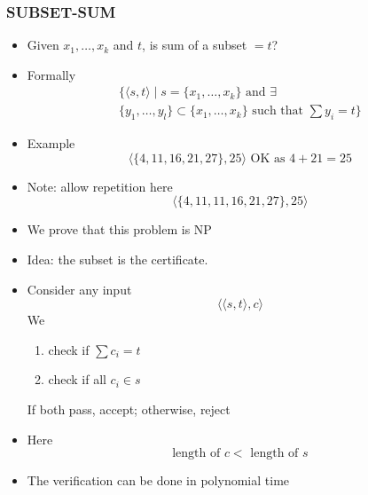 \begin{frame}[allowframebreaks] \frametitle{SUBSET-SUM}
  \begin{itemize}
\item Given $x_1, \ldots, x_k$ and $t$, is sum of a subset $=t$?
\item Formally
  \begin{gather*}
   \{\langle  s,t\rangle 
\mid s=\{x_1, \ldots, x_k\}
\mbox{ and }
\exists \\
\{y_1, \ldots, y_l\}
\subset \{x_1, \ldots, x_k\} \text{ such that }
\sum y_i =t\}
\end{gather*}
\item Example
  \begin{equation*}
\langle  \{4,11,16,21,27\},25\rangle  \text{ OK as } 4+21=25
\end{equation*}
\item Note: allow repetition here
  \begin{equation*}
\langle  \{4,11,11,16,21,27\},25\rangle 
\end{equation*}
\item We prove that this problem is NP
\item Idea: the subset is the certificate.
\item Consider any input
  \begin{equation*}
  \langle  \langle  s,t\rangle ,c\rangle 
\end{equation*}
We 
  \begin{enumerate}
  \item check if $\sum c_i=t$
  \item check if all $c_i \in s$
  \end{enumerate}
If both pass, accept; otherwise, reject
\item Here
  \begin{equation*}
  \text{length of } c < \text{  length of } s
\end{equation*}
\item The verification can be done in polynomial time
\end{itemize}
\end{frame}




